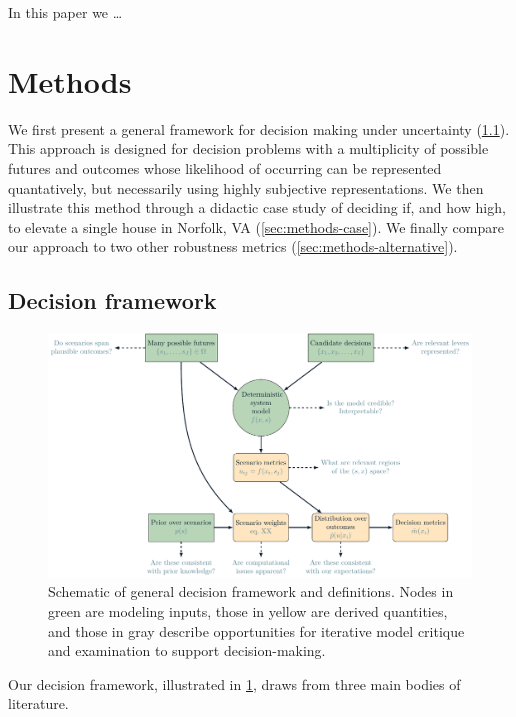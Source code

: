 \documentclass[12pt]{article}
\begin{document}
In this paper we \ldots

\section{Methods}\label{sec:methods}

We first present a general framework for decision making under uncertainty (\cref{sec:methods-framework}).
This approach is designed for decision problems with a multiplicity of possible futures and outcomes whose likelihood of occurring can be represented quantatively, but necessarily using highly subjective representations.
We then illustrate this method through a didactic case study of deciding if, and how high, to elevate a single house in Norfolk, VA (\cref{sec:methods-case}).
We finally compare our approach to two other robustness metrics (\cref{sec:methods-alternative}).

\subsection{Decision framework}\label{sec:methods-framework}

\begin{figure}
    \includegraphics[width=\textwidth]{conceptual.pdf}
    \caption{
        Schematic of general decision framework and definitions.
        Nodes in green are modeling inputs, those in yellow are derived quantities, and those in gray describe opportunities for iterative model critique and examination to support decision-making.
    }\label{fig:framework}
\end{figure}
Our decision framework, illustrated in \cref{fig:framework}, draws from three main bodies of literature.
\end{document}
